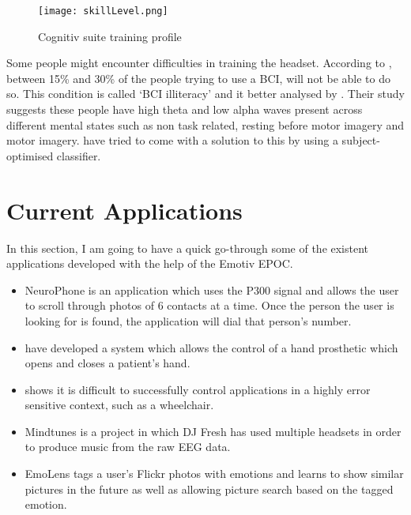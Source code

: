 \begin{figure}
  \centering
  \texttt{[image: skillLevel.png]}
  \caption{Cognitiv suite training profile}
    \label{fig:skillLevelMe}          
\end{figure}

Some people might encounter difficulties in training the headset. According to \cite{cureBCIilliteracy}, between 15\% and 30\% of the people trying to use a BCI, will not be able to do so. This condition is called `BCI illiteracy' and it better analysed by \cite{BCIilliteracy}. Their study suggests these people have high theta and low alpha waves present across different mental states such as non task related, resting before motor imagery and motor imagery. \cite{cureBCIilliteracy} have tried to come with a solution to this by using a subject-optimised classifier.

\section{Current Applications}
In this section, I am going to have a quick go-through some of the existent applications developed with the help of the Emotiv EPOC.

\begin{itemize}
	\item NeuroPhone \cite{neurophone} is an application which uses the P300 signal and allows the user to scroll through photos of 6 contacts at a time. Once the person the user is looking for is found, the application will dial that person's number.
	\item \cite{handOrthotic} have developed a system which allows the control of a hand prosthetic which opens and closes a patient's hand.
	\item \cite{wheelchairEEG} shows it is difficult to successfully control applications in a highly error sensitive context, such as a wheelchair. 
	\item Mindtunes \cite{mindtunes} is a project in which DJ Fresh has used multiple headsets in order to produce music from the raw EEG data.   
	\item EmoLens \cite{emoLens} tags a user's Flickr photos with emotions and learns to show similar pictures in the future as well as allowing picture search based on the tagged emotion.
\end{itemize}